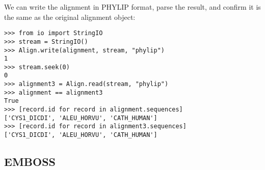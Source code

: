 We can write the alignment in PHYLIP format, parse the result, and confirm it is the same as the original alignment object:
\begin{verbatim}
>>> from io import StringIO
>>> stream = StringIO()
>>> Align.write(alignment, stream, "phylip")
1
>>> stream.seek(0)
0
>>> alignment3 = Align.read(stream, "phylip")
>>> alignment == alignment3
True
>>> [record.id for record in alignment.sequences]
['CYS1_DICDI', 'ALEU_HORVU', 'CATH_HUMAN']
>>> [record.id for record in alignment3.sequences]
['CYS1_DICDI', 'ALEU_HORVU', 'CATH_HUMAN']
\end{verbatim}

\subsection{EMBOSS}
\label{subsec:align_emboss}

